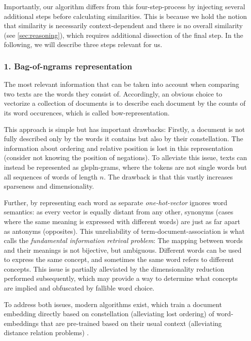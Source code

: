 Importantly, our algorithm differs from this four-step-process by injecting several additional steps before calculating similarities. This is because we hold the notion that similarity is necessarily context-dependent and there is no overall similarity (see \autoref{sec:reasoning}), which requires additional dissection of the final step. In the following, we will describe three steps relevant for us.


\subsubsection{1. Bag-of-ngrams representation}
\label{sec:techniques:bow}

The most relevant information that can be taken into account when comparing two texts are the words they consist of. Accordingly, an obvious choice to vectorize a collection of documents is to describe each document by the counts of its word occurences, which is called \gls{bow}-representation. 

This approach is simple but has important drawbacks: Firstly, a document is not fully described only by the words it contains but also by their constellation. The information about ordering and relative position is lost in this representation (consider not knowing the position of negations). To alleviate this issue, texts can instead be represented as glspl{n-grams}, where the tokens are not single words but all sequences of words of length $n$. The drawback is that this vastly increases sparseness and dimensionality.

Further, by representing each word as separate \textit{one-hot-vector} ignores word semantics: as every vector is equally distant from any other, synonyms (cases where the same meaning is expressed with different words) are just as far apart as antonyms (opposites). This unreliability of term-document-association is what \textcite{deerwester90} calls the \textit{fundamental information retrival problem}: The mapping between words and their meanings is not bijective, but ambiguous. Different words can be used to express the same concept, and sometimes the same word refers to different concepts. This issue is partially alleviated by the dimensionality reduction performed subsequently, which may provide a way to determine what concepts are implied and obfuscated by fallible word choice.

To address both issues, modern algorithms exist, which train a document embedding directly based on constellation (alleviating lost ordering) of word-embeddings that are pre-trained based on their usual context (alleviating distance relation problems)
. 

